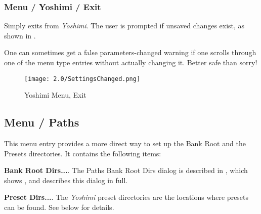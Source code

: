 \subsubsection{Menu / Yoshimi / Exit}
\label{subsubsec:menu_yoshimi_exit}

   Simply exits from \textsl{Yoshimi}.
   The user is prompted if unsaved changes exist, as shown in
   .

   One can sometimes get a false parameters-changed warning if one
   scrolls through one of the menu type entries without actually changing it.
   Better safe than sorry!

\begin{figure}[H]
   \centering
   \texttt{[image: 2.0/SettingsChanged.png]}
   \caption[Yoshimi Menu, Exit]{Yoshimi Menu, Exit}
   \label{fig:yoshimi_change_exit}
\end{figure}

%
% 





%

\subsection{Menu / Paths}
\label{subsec:menu_paths}

   This menu entry provides a more direct way to set up the Bank Root and
   the Presets directories.  It contains the following items:

   \begin{enumber}
      \item \textbf{Bank Root Dirs...}.
         The Paths Bank Root Dirs dialog is described in
         ,
         which shows
         , and describes this dialog in full.
      \item \textbf{Preset Dirs...}.
         The \textsl{Yoshimi} preset directories are the locations where
         presets can be found.  See below for details.
   \end{enumber}

